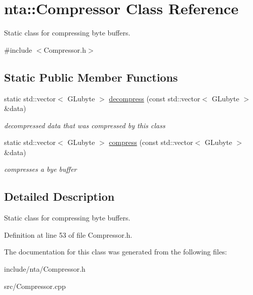 \hypertarget{classnta_1_1Compressor}{}\section{nta\+:\+:Compressor Class Reference}
\label{classnta_1_1Compressor}


Static class for compressing byte buffers.  




{\ttfamily \#include $<$Compressor.\+h$>$}

\subsection*{Static Public Member Functions}
\begin{DoxyCompactItemize}
\item 
\mbox{\label{classnta_1_1Compressor_aaf2c8b87946d2cee8b4edcf4c48f7f71}} 
static std\+::vector$<$ G\+Lubyte $>$ \hyperlink{classnta_1_1Compressor_aaf2c8b87946d2cee8b4edcf4c48f7f71}{decompress} (const std\+::vector$<$ G\+Lubyte $>$ \&data)
\begin{DoxyCompactList}\small\item\em decompressed data that was compressed by this class \end{DoxyCompactList}\item 
\mbox{\label{classnta_1_1Compressor_ac5f5822b598309d4ef6a89edb7bdcf10}} 
static std\+::vector$<$ G\+Lubyte $>$ \hyperlink{classnta_1_1Compressor_ac5f5822b598309d4ef6a89edb7bdcf10}{compress} (const std\+::vector$<$ G\+Lubyte $>$ \&data)
\begin{DoxyCompactList}\small\item\em compresses a bye buffer \end{DoxyCompactList}\end{DoxyCompactItemize}


\subsection{Detailed Description}
Static class for compressing byte buffers. 

Definition at line 53 of file Compressor.\+h.



The documentation for this class was generated from the following files\+:\begin{DoxyCompactItemize}
\item 
include/nta/Compressor.\+h\item 
src/Compressor.\+cpp\end{DoxyCompactItemize}
